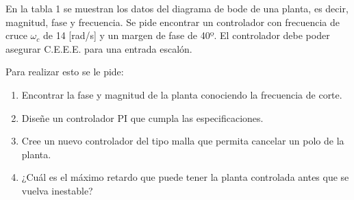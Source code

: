 \documentclass[
  11pt,
  letterpaper,
   addpoints,
   answers
  ]{exam}
\begin{document}
\begin{questions}
    \question En la tabla 1 se muestran los datos del diagrama de bode de una planta, es decir, magnitud, fase y frecuencia. Se pide encontrar un controlador con frecuencia de cruce $\omega_c$ de 14 [rad/s] y un margen de fase de 40º. El controlador debe poder asegurar C.E.E.E. para una entrada escalón.

    Para realizar esto se le pide:
    \begin{enumerate}
        \item Encontrar la fase y magnitud de la planta conociendo la frecuencia de corte.
        \item Diseñe un controlador PI que cumpla las especificaciones.
        \item Cree un nuevo controlador del tipo malla que permita cancelar un polo de la planta.
        \item ¿Cuál es el máximo retardo que puede tener la planta controlada antes que se vuelva inestable?
    \end{enumerate}
    

\end{questions}
\end{document}
